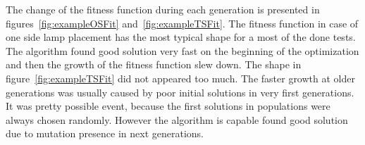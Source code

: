 The change of the fitness function during each generation is  presented in figures~\ref{fig:exampleOSFit} and~\ref{fig:exampleTSFit}. The fitness function in case of one side lamp placement has the most typical shape for a most of the done tests. The algorithm found good solution very fast on the beginning of the optimization and then the growth of the fitness function slew down. The shape in figure~\ref{fig:exampleTSFit} did not appeared too much. The faster growth at older generations was usually caused by poor initial solutions in very first generations. It was pretty possible event, because the first solutions in populations were always chosen randomly. However the algorithm is capable found good solution due to mutation presence in next generations.


\begin{figure}[t]
        \centering
        \\
        \\

\end{figure}
